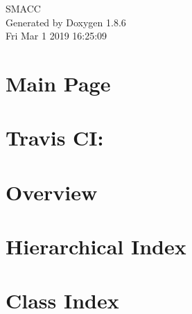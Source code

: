 \documentclass[twoside]{book}
\newcommand{\clearemptydoublepage}{%
  \newpage{\pagestyle{empty}\cleardoublepage}%
}
\begin{document}
\hypersetup{pageanchor=false}
\begin{titlepage}
\vspace*{7cm}
\begin{center}%
{\Large S\-M\-A\-C\-C }\\
\vspace*{1cm}
{\large Generated by Doxygen 1.8.6}\\
\vspace*{0.5cm}
{\small Fri Mar 1 2019 16:25:09}\\
\end{center}
\end{titlepage}
\clearemptydoublepage
\tableofcontents
\clearemptydoublepage
{}
\hypersetup{pageanchor=true}

\chapter{Main Page}
\label{index}\hypertarget{index}{}
\chapter{Travis C\-I\-:}
\label{md_README}
\hypertarget{md_README}{}

\chapter{Overview}
\label{md_rosdoc_lite_README}
\hypertarget{md_rosdoc_lite_README}{}

\chapter{Hierarchical Index}

\chapter{Class Index}

\end{document}
